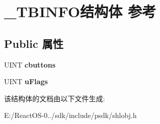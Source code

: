 \hypertarget{struct___t_b_i_n_f_o}{}\section{\+\_\+\+T\+B\+I\+N\+F\+O结构体 参考}
\label{struct___t_b_i_n_f_o}
\subsection*{Public 属性}
\begin{DoxyCompactItemize}
\item 
\mbox{\label{struct___t_b_i_n_f_o_acb1d1a8978a512c01ed96c5728bdf406}} 
U\+I\+NT {\bfseries cbuttons}
\item 
\mbox{\label{struct___t_b_i_n_f_o_af66a2eb0cc9f32a519fddb65865f1a16}} 
U\+I\+NT {\bfseries u\+Flags}
\end{DoxyCompactItemize}


该结构体的文档由以下文件生成\+:\begin{DoxyCompactItemize}
\item 
E\+:/\+React\+O\+S-\/0../sdk/include/psdk/shlobj.\+h\end{DoxyCompactItemize}
